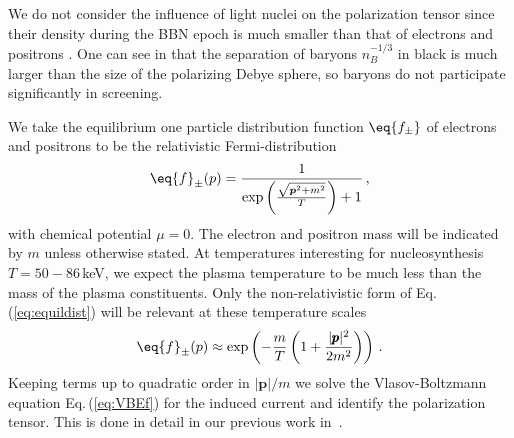 We do not consider the influence of light nuclei on the polarization tensor since their density during the BBN epoch is much smaller than that of electrons and positrons . One can see in  that the separation of baryons $n_B^{-1/3}$ in black is much larger than the size of the polarizing Debye sphere, so baryons do not participate significantly in screening.

We take the equilibrium one particle distribution function $\eq{f_\pm}$ of electrons and positrons to be the relativistic Fermi-distribution
\begin{equation}\label{eq:equildist}
\eq{f}_\pm(p) = \frac{1}{\exp{\left(\frac{\sqrt{\boldsymbol{p}^2 + m^2}}{T}\right)}
+1}\,,
\end{equation}
with chemical potential $\mu = 0 $. The electron and positron mass will be indicated by $m$ unless otherwise stated. At temperatures interesting for nucleosynthesis $T = 50-86$\,keV, we expect the plasma temperature to be much less than the mass of the plasma constituents. Only the non-relativistic form of Eq.\,(\ref{eq:equildist}) will be relevant at these temperature scales
\begin{equation}
\eq{f}_\pm(p) \approx \exp\left(- \frac{m}{T}\left(1+\frac{|\pmb{p}|^2}{2m^2}\right)\right)\,.
\end{equation}
Keeping terms up to quadratic order in $|\boldsymbol{p}|/m$ we solve the Vlasov-Boltzmann equation Eq.\,(\ref{eq:VBEf}) for the induced current and identify the polarization tensor. This is done in detail in our previous work in~\citep{Formanek:2021blc}.

